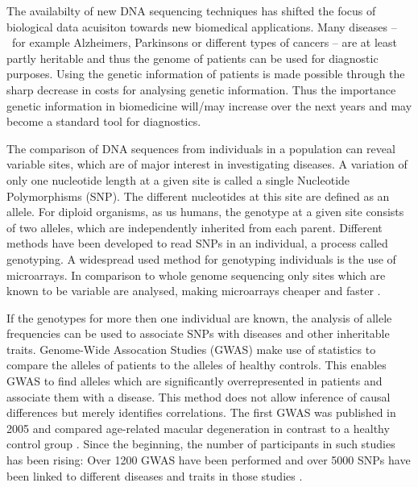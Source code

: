 \documentclass[10pt]{article}
\begin{document}
The availabilty of new DNA sequencing techniques has shifted the focus of biological data acuisiton towards new biomedical applications.
Many diseases – for example Alzheimers, Parkinsons or different types of cancers – are at least partly heritable and thus the genome 
of patients can be used for diagnostic purposes. Using the genetic information of patients is made possible through the sharp decrease in costs for analysing genetic information. 
Thus the importance genetic information in biomedicine will/may increase over the next years and may become a standard tool for diagnostics.

The comparison of DNA sequences from individuals in a population can reveal variable sites, which are of major interest in investigating diseases. 
A variation of only one nucleotide length at a given site is called a single Nucleotide Polymorphisms (SNP). 
The different nucleotides at this site are defined as an allele.
For diploid organisms, as us humans, the genotype at a given site consists of two alleles, which are independently inherited from each parent.
Different methods have been developed to read SNPs in an individual, a
process called genotyping. A widespread used method for genotyping individuals is the use of microarrays.
In comparison to whole genome sequencing only sites which are known to be variable are analysed, making microarrays cheaper and faster \cite{Brown1999}. 


If the genotypes for more then one individual are known, the analysis of
allele frequencies can be used to associate SNPs with diseases and other inheritable traits. Genome-Wide Assocation Studies
(GWAS) make use of statistics to compare the alleles of patients to the alleles of healthy controls. This
enables GWAS to find alleles which are significantly overrepresented in patients and associate them with a disease.
This method does not allow inference of causal differences but merely identifies correlations. 
The first GWAS was published in 2005 and compared age-related macular degeneration in contrast 
to a healthy control group \cite{Klein2005}. Since the beginning, the number of participants in 
such studies has been rising: Over 1200 GWAS have been performed \cite{Johnson2009} and over 
5000 SNPs have been linked to different diseases and traits in those studies \cite{Hindorff2009}. 
\end{document}
